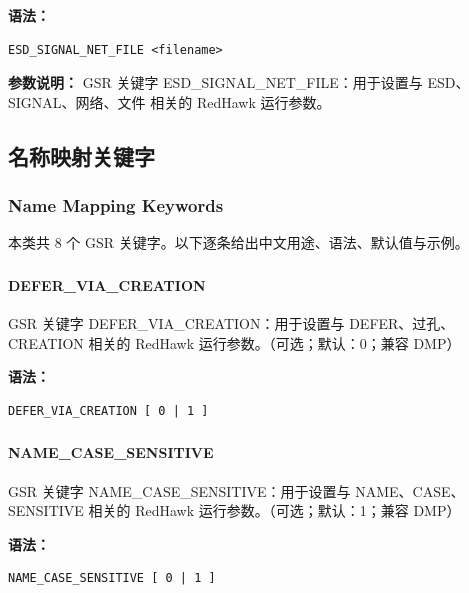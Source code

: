 \textbf{语法：}
\begin{lstlisting}
ESD_SIGNAL_NET_FILE <filename>
\end{lstlisting}

\textbf{参数说明：}
GSR 关键字 ESD\_SIGNAL\_NET\_FILE：用于设置与 ESD、SIGNAL、网络、文件 相关的 RedHawk 运行参数。

\subsection{名称映射关键字}
\subsubsection*{Name Mapping Keywords}

本类共 8 个 GSR 关键字。以下逐条给出中文用途、语法、默认值与示例。

\subsubsection{}
\paragraph*{DEFER_VIA_CREATION}

GSR 关键字 DEFER_VIA_CREATION：用于设置与 DEFER、过孔、CREATION 相关的 RedHawk 运行参数。（可选；默认：0；兼容 DMP）

\textbf{语法：}
\begin{lstlisting}
DEFER_VIA_CREATION [ 0 | 1 ]
\end{lstlisting}

\subsubsection{}
\paragraph*{NAME_CASE_SENSITIVE}

GSR 关键字 NAME_CASE_SENSITIVE：用于设置与 NAME、CASE、SENSITIVE 相关的 RedHawk 运行参数。（可选；默认：1；兼容 DMP）

\textbf{语法：}
\begin{lstlisting}
NAME_CASE_SENSITIVE [ 0 | 1 ]
\end{lstlisting}

\subsubsection{}

